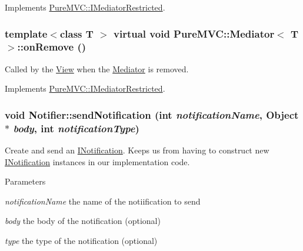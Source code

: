 Implements \hyperlink{class_pure_m_v_c_1_1_i_mediator_restricted_a1c9b8d32557fdf7c3b03c7b8a6c1bb05}{PureMVC::IMediatorRestricted}.\hypertarget{class_pure_m_v_c_1_1_mediator_a2fc2d7f514cb9a8b25d40185157c7a48}{
\subsubsection[{onRemove}]{\setlength{\rightskip}{0pt plus 5cm}template$<$class T $>$ virtual void {\bf PureMVC::Mediator}$<$ T $>$::onRemove ()}}
\label{class_pure_m_v_c_1_1_mediator_a2fc2d7f514cb9a8b25d40185157c7a48}


Called by the \hyperlink{class_pure_m_v_c_1_1_view}{View} when the \hyperlink{class_pure_m_v_c_1_1_mediator}{Mediator} is removed. 

Implements \hyperlink{class_pure_m_v_c_1_1_i_mediator_restricted_ae6e471d85f08ed86fae3b1e7377f8d69}{PureMVC::IMediatorRestricted}.\hypertarget{class_pure_m_v_c_1_1_notifier_a55a358ee2661ecc08400653016fdb497}{
\subsubsection[{sendNotification}]{\setlength{\rightskip}{0pt plus 5cm}void Notifier::sendNotification (int {\em notificationName}, \/  {\bf Object} $\ast$ {\em body}, \/  int {\em notificationType})}}
\label{class_pure_m_v_c_1_1_notifier_a55a358ee2661ecc08400653016fdb497}


Create and send an {\ttfamily \hyperlink{class_pure_m_v_c_1_1_i_notification}{INotification}}. Keeps us from having to construct new \hyperlink{class_pure_m_v_c_1_1_i_notification}{INotification} instances in our implementation code. 
\begin{DoxyParams}{Parameters}
\item[{\em notificationName}]the name of the notiification to send \item[{\em body}]the body of the notification (optional) \item[{\em type}]the type of the notification (optional) \end{DoxyParams}


